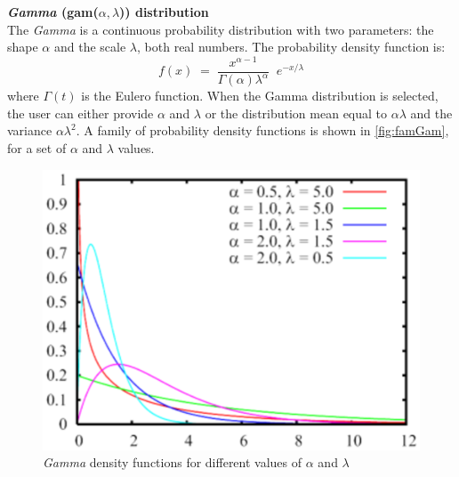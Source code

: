 \textbf{\emph{Gamma} (gam($\alpha,\lambda$)) distribution}\\
The \emph{Gamma} is a continuous probability distribution with two
parameters: the shape $\alpha$ and the scale $\lambda$, both real
numbers. The probability density function is:
\[
f(x)\; = \; \frac{x^{\alpha-1}}{\Gamma(\alpha) \lambda^\alpha} \;
\; e^{- x/\lambda}
\]
where $\Gamma(t)$ is the Eulero function. When the Gamma
distribution is selected, the user can either provide $\alpha$ and
$\lambda$ or the distribution mean equal to $\alpha \lambda$ and
the variance $\alpha \lambda^2$. A family of probability density
functions is shown in \autoref{fig:famGam}, for a set of $\alpha$
and $\lambda$ values.
\begin{figure}[htb]
    \begin{center}
        \includegraphics[scale=.5]{img/jsimg/4.6.eps}
    \end{center}
    \caption{\emph{Gamma} density functions for different values of $\alpha$ and $\lambda$}
    \label{fig:famGam}
\end{figure}\\

